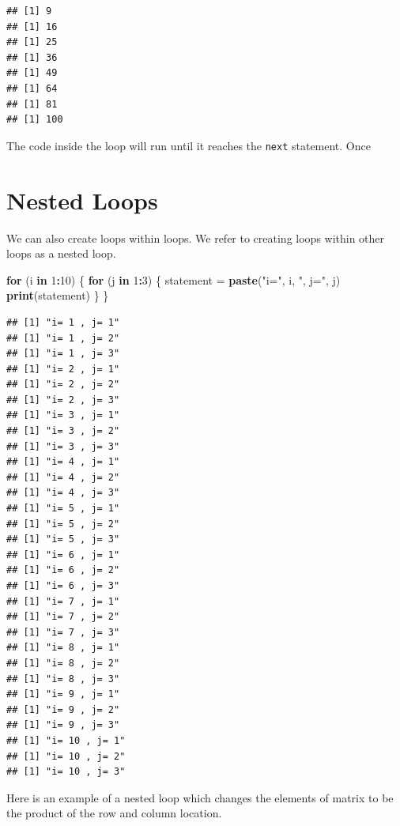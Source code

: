 \documentclass[
]{book}
\newenvironment{Shaded}{\begin{snugshade}}{\end{snugshade}}
\newcommand{\ControlFlowTok}[1]{\textcolor[rgb]{0.13,0.29,0.53}{\textbf{#1}}}
\newcommand{\DecValTok}[1]{\textcolor[rgb]{0.00,0.00,0.81}{#1}}
\newcommand{\KeywordTok}[1]{\textcolor[rgb]{0.13,0.29,0.53}{\textbf{#1}}}
\newcommand{\NormalTok}[1]{#1}
\newcommand{\OperatorTok}[1]{\textcolor[rgb]{0.81,0.36,0.00}{\textbf{#1}}}
\newcommand{\StringTok}[1]{\textcolor[rgb]{0.31,0.60,0.02}{#1}}
\begin{document}
\begin{verbatim}
## [1] 9
## [1] 16
## [1] 25
## [1] 36
## [1] 49
## [1] 64
## [1] 81
## [1] 100
\end{verbatim}

The code inside the loop will run until it reaches the \texttt{next} statement. Once

\hypertarget{nested-loops}{%
\section{Nested Loops}\label{nested-loops}}

We can also create loops within loops. We refer to creating loops within other loops as a nested loop.

\begin{Shaded}
\begin{Highlighting}[]
\ControlFlowTok{for}\NormalTok{ (i }\ControlFlowTok{in} \DecValTok{1}\OperatorTok{:}\DecValTok{10}\NormalTok{) \{}
    \ControlFlowTok{for}\NormalTok{ (j }\ControlFlowTok{in} \DecValTok{1}\OperatorTok{:}\DecValTok{3}\NormalTok{) \{}
\NormalTok{        statement =}\StringTok{ }\KeywordTok{paste}\NormalTok{(}\StringTok{"i="}\NormalTok{,}
\NormalTok{            i, }\StringTok{", j="}\NormalTok{,}
\NormalTok{            j)}
        \KeywordTok{print}\NormalTok{(statement)}
\NormalTok{    \}}
\NormalTok{\}}
\end{Highlighting}
\end{Shaded}

\begin{verbatim}
## [1] "i= 1 , j= 1"
## [1] "i= 1 , j= 2"
## [1] "i= 1 , j= 3"
## [1] "i= 2 , j= 1"
## [1] "i= 2 , j= 2"
## [1] "i= 2 , j= 3"
## [1] "i= 3 , j= 1"
## [1] "i= 3 , j= 2"
## [1] "i= 3 , j= 3"
## [1] "i= 4 , j= 1"
## [1] "i= 4 , j= 2"
## [1] "i= 4 , j= 3"
## [1] "i= 5 , j= 1"
## [1] "i= 5 , j= 2"
## [1] "i= 5 , j= 3"
## [1] "i= 6 , j= 1"
## [1] "i= 6 , j= 2"
## [1] "i= 6 , j= 3"
## [1] "i= 7 , j= 1"
## [1] "i= 7 , j= 2"
## [1] "i= 7 , j= 3"
## [1] "i= 8 , j= 1"
## [1] "i= 8 , j= 2"
## [1] "i= 8 , j= 3"
## [1] "i= 9 , j= 1"
## [1] "i= 9 , j= 2"
## [1] "i= 9 , j= 3"
## [1] "i= 10 , j= 1"
## [1] "i= 10 , j= 2"
## [1] "i= 10 , j= 3"
\end{verbatim}

Here is an example of a nested loop which changes the elements of matrix to be the product of the row and column location.
\end{document}
